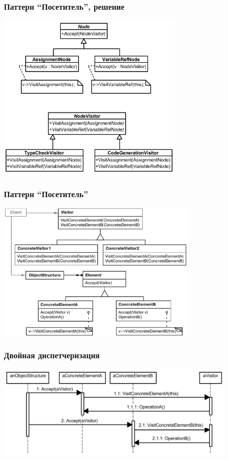 \documentclass[xetex,mathserif,serif]{beamer}
\begin{document}
	\begin{frame}
		\frametitle{Паттерн ``Посетитель'', решение}
		\begin{center}
			\includegraphics[width=0.7\textwidth]{visitorExampleSolution.png}
		\end{center}
	\end{frame}

	\begin{frame}
		\frametitle{Паттерн ``Посетитель''}
		\begin{center}
			\includegraphics[width=0.75\textwidth]{visitor.png}
		\end{center}
	\end{frame}

	\begin{frame}
		\frametitle{Двойная диспетчеризация}
		\begin{center}
			\includegraphics[width=0.9\textwidth]{doubleDispatching.png}
		\end{center}
	\end{frame}
\end{document}
